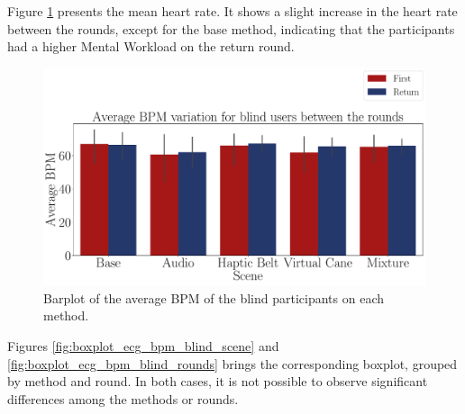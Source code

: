 

Figure \ref{fig:barplot_ecg_bpm_5_scene_blind} presents the mean heart rate. It shows a slight increase in the heart rate between the rounds, except for the base method, indicating that the participants had a higher Mental Workload on the return round.

\begin{figure}[!htb]
    \centering
    \includegraphics[width = \textwidth]{Resultados/ECG/Figuras/pdf/barplot_ecg_bpm_5_scene_blind.pdf}
    \caption{Barplot of the average BPM of the blind participants on each method.}
    \label{fig:barplot_ecg_bpm_5_scene_blind}
\end{figure}

% 
%

Figures \ref{fig:boxplot_ecg_bpm_blind_scene} and \ref{fig:boxplot_ecg_bpm_blind_rounds} brings the corresponding boxplot, grouped by method and round. In both cases, it is not possible to observe significant differences among the methods or rounds.

